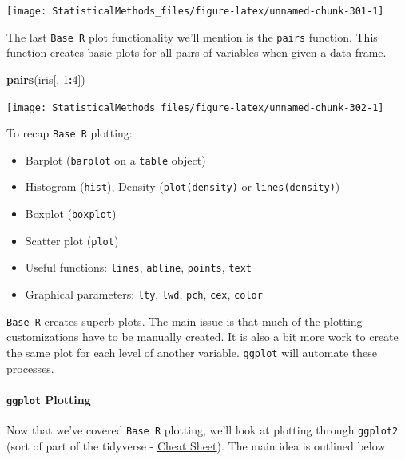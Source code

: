 \documentclass[
]{book}
\newenvironment{Shaded}{\begin{snugshade}}{\end{snugshade}}
\newcommand{\DecValTok}[1]{\textcolor[rgb]{0.00,0.00,0.81}{#1}}
\newcommand{\KeywordTok}[1]{\textcolor[rgb]{0.13,0.29,0.53}{\textbf{#1}}}
\newcommand{\NormalTok}[1]{#1}
\newcommand{\OperatorTok}[1]{\textcolor[rgb]{0.81,0.36,0.00}{\textbf{#1}}}
\let\oldparagraph\paragraph
\renewcommand{\paragraph}[1]{\oldparagraph{#1}\mbox{}}
\theoremstyle{definition}
\theoremstyle{definition}
\theoremstyle{definition}
\theoremstyle{remark}
\begin{document}
\begin{center}\texttt{[image: StatisticalMethods\_files/figure-latex/unnamed-chunk-301-1]} \end{center}

The last \texttt{Base\ R} plot functionality we'll mention is the \texttt{pairs} function. This function creates basic plots for all pairs of variables when given a data frame.

\begin{Shaded}
\begin{Highlighting}[]
\KeywordTok{pairs}\NormalTok{(iris[, }\DecValTok{1}\OperatorTok{:}\DecValTok{4}\NormalTok{])}
\end{Highlighting}
\end{Shaded}

\begin{center}\texttt{[image: StatisticalMethods\_files/figure-latex/unnamed-chunk-302-1]} \end{center}

To recap \texttt{Base\ R} plotting:

\begin{itemize}
\item
  Barplot (\texttt{barplot} on a \texttt{table} object)
\item
  Histogram (\texttt{hist}), Density (\texttt{plot(density)} or \texttt{lines(density)})
\item
  Boxplot (\texttt{boxplot})
\item
  Scatter plot (\texttt{plot})
\item
  Useful functions: \texttt{lines}, \texttt{abline}, \texttt{points}, \texttt{text}
\item
  Graphical parameters: \texttt{lty}, \texttt{lwd}, \texttt{pch}, \texttt{cex}, \texttt{color}
\end{itemize}

\texttt{Base\ R} creates superb plots. The main issue is that much of the plotting customizations have to be manually created. It is also a bit more work to create the same plot for each level of another variable. \texttt{ggplot} will automate these processes.

\hypertarget{ggplot-plotting}{%
\paragraph{\texorpdfstring{\texttt{ggplot} Plotting}{ggplot Plotting}}\label{ggplot-plotting}}

Now that we've covered \texttt{Base\ R} plotting, we'll look at plotting through \texttt{ggplot2} (sort of part of the tidyverse - \href{https://www.google.com/url?sa=t\&rct=j\&q=\&esrc=s\&source=web\&cd=2\&cad=rja\&uact=8\&ved=2ahUKEwjFu_ep-rroAhXnknIEHf13Bq4QFjABegQICBAB\&url=https\%3A\%2F\%2Frstudio.com\%2Fwp-content\%2Fuploads\%2F2016\%2F11\%2Fggplot2-cheatsheet-2.1.pdf\&usg=AOvVaw1-6jSR5VfWs7V62OYxtDtG}{Cheat Sheet}). The main idea is outlined below:
\end{document}
